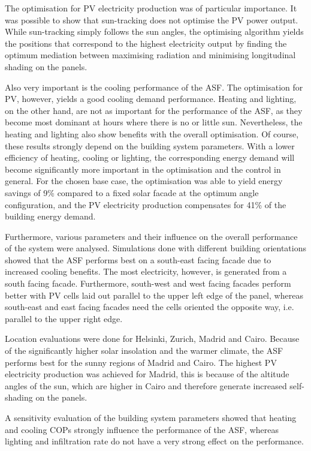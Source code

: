 The optimisation for PV electricity production was of particular importance. It was possible to show that sun-tracking does not optimise the PV power output. While sun-tracking simply follows the sun angles, the optimising algorithm yields the positions that correspond to the highest electricity output by finding the optimum mediation between maximising radiation and minimising longitudinal shading on the panels. 

Also very important is the cooling performance of the ASF. The optimisation for PV, however, yields a good cooling demand performance. Heating and lighting, on the other hand, are not as important for the performance of the ASF, as they become most dominant at hours where there is no or little sun. Nevertheless, the heating and lighting also show benefits with the overall optimisation. Of course, these results strongly depend on the building system parameters. With a lower efficiency of heating, cooling or lighting, the corresponding energy demand will become significantly more important in the optimisation and the control in general. For the chosen base case, the optimisation was able to yield energy savings of 9\% compared to a fixed solar facade at the optimum angle configuration, and the PV electricity production compensates for 41\% of the building energy demand. 

Furthermore, various parameters and their influence on the overall performance of the system were analysed. Simulations done with different building orientations showed that the ASF performs best on a south-east facing facade due to increased cooling benefits. The most electricity, however, is generated from a south facing facade. Furthermore, south-west and west facing facades perform better with PV cells laid out parallel to the upper left edge of the panel, whereas south-east and east facing facades need the cells oriented the opposite way, i.e. parallel to the upper right edge. 

Location evaluations were done for Helsinki, Zurich, Madrid and Cairo. Because of the significantly higher solar insolation and the warmer climate, the ASF performs best for the sunny regions of Madrid and Cairo. The highest PV electricity production was achieved for Madrid, this is because of the altitude angles of the sun, which are higher in Cairo and therefore generate increased self-shading on the panels. 

A sensitivity evaluation of the building system parameters showed that heating and cooling COPs strongly influence the performance of the ASF, whereas lighting and infiltration rate do not have a very strong effect on the performance. 

